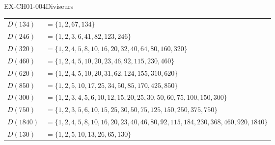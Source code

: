 \documentclass[12pt, a4paper]{article}
\begin{document}
\begin{exercice}{EX-CH01-004}{Diviseurs}
\medskip
{}%
{\def\arraystretch{1.2}
\begin{tabularx}{\linewidth}{lX}
$D(134)$  & $= \{1, 2, 67, 134\}$ \\
$D(246)$  & $= \{1, 2, 3, 6, 41, 82, 123, 246\}$ \\
$D(320)$  & $= \{1, 2, 4, 5, 8, 10, 16, 20, 32, 40, 64, 80, 160, 320\}$ \\
$D(460)$  & $= \{1, 2, 4, 5, 10, 20, 23, 46, 92, 115, 230, 460\}$ \\
$D(620)$  & $= \{1, 2, 4, 5, 10, 20, 31, 62, 124, 155, 310, 620\}$ \\
$D(850)$  & $= \{1, 2, 5, 10, 17, 25, 34, 50, 85, 170, 425, 850\}$ \\
$D(300)$  & $= \{1, 2, 3, 4, 5, 6, 10, 12, 15, 20, 25, 30, 50, 60, 75, 100, 150, 300\}$ \\
$D(750)$  & $= \{1, 2, 3, 5, 6, 10, 15, 25, 30, 50, 75, 125, 150, 250, 375, 750\}$ \\
$D(1840)$ & $= \{1, 2, 4, 5, 8, 10, 16, 20, 23, 40, 46, 80, 92, 115, 184, 230, 368, 460, 920, 1840\}$ \\
$D(130)$  & $= \{1, 2, 5, 10, 13, 26, 65, 130\}$ \\
\end{tabularx}
\def\arraystretch{1}}

\end{exercice}
\end{document}
